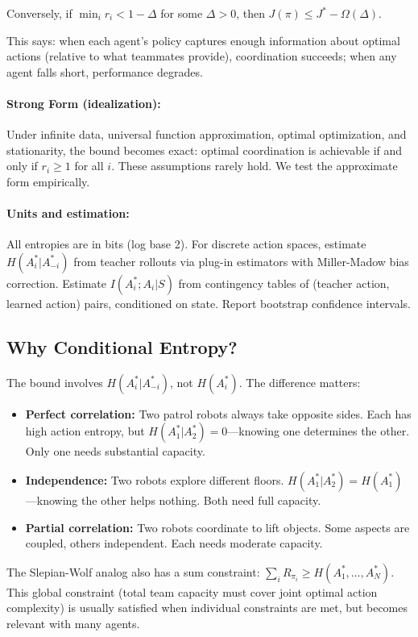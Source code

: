 \documentclass[10pt, letterpaper]{article}
\begin{document}
Conversely, if $\min_i r_i < 1 - \Delta$ for some $\Delta > 0$, then $J(\pi) \leq J^* - \Omega(\Delta)$.

\bigskip

This says: when each agent's policy captures enough information about optimal actions (relative to what teammates provide), coordination succeeds; when any agent falls short, performance degrades.

\paragraph{Strong Form (idealization):} Under infinite data, universal function approximation, optimal optimization, and stationarity, the bound becomes exact: optimal coordination is achievable if and only if $r_i \geq 1$ for all $i$. These assumptions rarely hold. We test the approximate form empirically.

\paragraph{Units and estimation:} All entropies are in bits (log base 2). For discrete action spaces, estimate $H(A_i^*|A_{-i}^*)$ from teacher rollouts via plug-in estimators with Miller-Madow bias correction. Estimate $I(A_i^*; A_i|S)$ from contingency tables of (teacher action, learned action) pairs, conditioned on state. Report bootstrap confidence intervals.

\subsection{Why Conditional Entropy?}

The bound involves $H(A_i^*|A_{-i}^*)$, not $H(A_i^*)$. The difference matters:
\begin{itemize}
    \item \textbf{Perfect correlation:} Two patrol robots always take opposite sides. Each has high action entropy, but $H(A_1^*|A_2^*) = 0$---knowing one determines the other. Only one needs substantial capacity.
    \item \textbf{Independence:} Two robots explore different floors. $H(A_1^*|A_2^*) = H(A_1^*)$---knowing the other helps nothing. Both need full capacity.
    \item \textbf{Partial correlation:} Two robots coordinate to lift objects. Some aspects are coupled, others independent. Each needs moderate capacity.
\end{itemize}
The Slepian-Wolf analog also has a sum constraint: $\sum_i R_{\pi_i} \geq H(A_1^*, \ldots, A_N^*)$. This global constraint (total team capacity must cover joint optimal action complexity) is usually satisfied when individual constraints are met, but becomes relevant with many agents.
\end{document}
